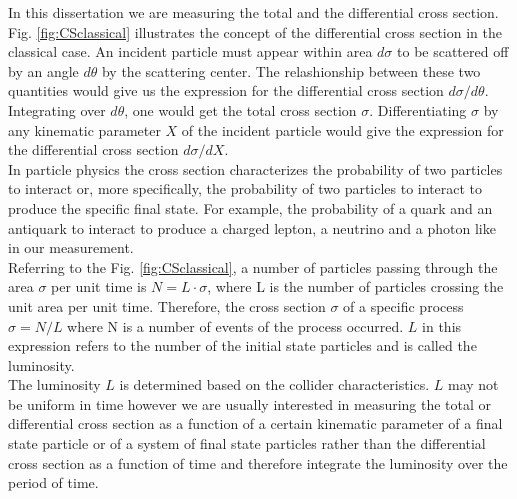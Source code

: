 In this dissertation we are measuring the total and the differential cross section. Fig. \ref{fig:CSclassical} illustrates the concept of the differential cross section in the classical case. An incident particle must appear within area $d\sigma$ to be scattered off by an angle $d\theta$ by the scattering center. The relashionship between these two quantities would give us the expression for the differential cross section $d\sigma/d\theta$. Integrating over $d\theta$, one would get the total cross section $\sigma$. Differentiating $\sigma$ by any kinematic parameter $X$ of the incident particle would give the expression for the differential cross section $d\sigma/dX$.\\

In particle physics the cross section characterizes the probability of two particles to interact or, more specifically, the probability of two particles to interact to produce the specific final state. For example, the probability of a quark and an antiquark to interact to produce a charged lepton, a neutrino and a photon like in our measurement.\\

Referring to the Fig. \ref{fig:CSclassical}, a number of particles passing through the area $\sigma$ per unit time is $N=L \cdot \sigma$, where L is the number of particles crossing the unit area per unit time. Therefore, the cross section $\sigma$ of a specific process $\sigma=N/L$ where N is a number of events of the process occurred. $L$ in this expression refers to the number of the initial state particles and is called the luminosity. \\
  

The luminosity $L$ is determined based on the collider characteristics. $L$ may not be uniform in time however we are usually interested in measuring the total or differential cross section as a function of a certain kinematic parameter of a final state particle or of a system of final state particles rather than the differential cross section as a function of time and therefore integrate the luminosity over the period of time.\\

